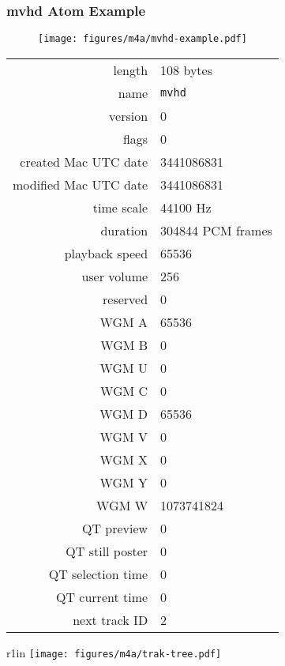 \subsubsection{mvhd Atom Example}
\begin{figure}[h]
  \texttt{[image: figures/m4a/mvhd-example.pdf]}
\end{figure}
\par
\noindent
\begin{tabular}{rl}
  \textsf{length} & 108 bytes \\
  \textsf{name} & \texttt{mvhd} \\
  \textsf{version} & 0 \\
  \textsf{flags} & 0 \\
  \textsf{created Mac UTC date} & 3441086831 \\
  \textsf{modified Mac UTC date} & 3441086831 \\
  \textsf{time scale} & 44100 Hz \\
  \textsf{duration} & 304844 PCM frames \\
  \textsf{playback speed} & 65536 \\
  \textsf{user volume} & 256 \\
  \textsf{reserved} & 0 \\
  \textsf{WGM A} & 65536 \\
  \textsf{WGM B} & 0 \\
  \textsf{WGM U} & 0 \\
  \textsf{WGM C} & 0 \\
  \textsf{WGM D} & 65536 \\
  \textsf{WGM V} & 0 \\
  \textsf{WGM X} & 0 \\
  \textsf{WGM Y} & 0 \\
  \textsf{WGM W} & 1073741824 \\
  \textsf{QT preview} & 0 \\
  \textsf{QT still poster} & 0 \\
  \textsf{QT selection time} & 0 \\
  \textsf{QT current time} & 0 \\
  \textsf{next track ID} & 2 \\
\end{tabular}

\clearpage

\begin{wrapfigure}[5]{r}{1in}
  \texttt{[image: figures/m4a/trak-tree.pdf]}
\end{wrapfigure}
